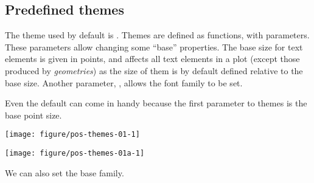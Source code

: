 \documentclass[krantz2]{krantz}\usepackage{knitr}%
\begin{document}
\subsection{Predefined themes}
The theme used by default is . Themes are defined as functions, with parameters. These parameters allow changing some ``base'' properties. The base size for text elements is given in points, and affects all text elements in a plot (except those produced by \emph{geometries}) as the size of them is by default defined relative to the base size. Another parameter, , allows the font family to be set.

Even the default  can come in handy because the first parameter to themes is the base point size.


\begin{knitrout}\footnotesize
{}\color{fgcolor}\begin{kframe}
\begin{alltt}
  \hlopt{+}
  \hlstd{()} \hlopt{+}
  \hlstd{(}\hlstd{)}
\end{alltt}
\end{kframe}

{\centering \texttt{[image: figure/pos-themes-01-1]} 

}



\end{knitrout}

\begin{knitrout}\footnotesize
{}\color{fgcolor}\begin{kframe}
\begin{alltt}
  \hlopt{+}
  \hlstd{()} \hlopt{+}
  \hlstd{(}\hlstd{)}
\end{alltt}
\end{kframe}

{\centering \texttt{[image: figure/pos-themes-01a-1]} 

}



\end{knitrout}

We can also set the base family.
\end{document}
